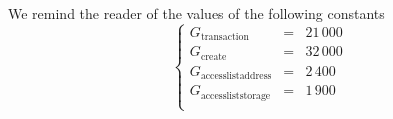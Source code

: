 	\saNote{}
	We remind the reader of the values of the following constants
	\[
		\left\{ \begin{array}{lcr}
			G_\text{transaction}       & \!\!\! = \!\!\! & 21\,000 \\
			G_\text{create}            & \!\!\! = \!\!\! & 32\,000 \\
			G_\text{accesslistaddress} & \!\!\! = \!\!\! & 2\,400  \\
			G_\text{accessliststorage} & \!\!\! = \!\!\! & 1\,900  \\
		\end{array} \right.
	\]
